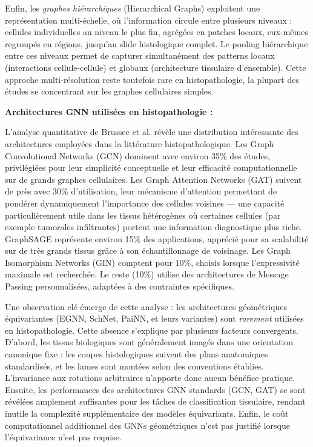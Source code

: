 Enfin, les \textit{graphes hiérarchiques} (Hierarchical Graphs) exploitent une représentation multi-échelle, où l'information circule entre plusieurs niveaux : cellules individuelles au niveau le plus fin, agrégées en patches locaux, eux-mêmes regroupés en régions, jusqu'au slide histologique complet. Le pooling hiérarchique entre ces niveaux permet de capturer simultanément des patterns locaux (interactions cellule-cellule) et globaux (architecture tissulaire d'ensemble). Cette approche multi-résolution reste toutefois rare en histopathologie, la plupart des études se concentrant sur les graphes cellulaires simples.

\textbf{Architectures GNN utilisées en histopathologie :}

L'analyse quantitative de Brussee et al. révèle une distribution intéressante des architectures employées dans la littérature histopathologique. Les Graph Convolutional Networks (GCN) dominent avec environ 35\% des études, privilégiées pour leur simplicité conceptuelle et leur efficacité computationnelle sur de grands graphes cellulaires. Les Graph Attention Networks (GAT) suivent de près avec 30\% d'utilisation, leur mécanisme d'attention permettant de pondérer dynamiquement l'importance des cellules voisines — une capacité particulièrement utile dans les tissus hétérogènes où certaines cellules (par exemple tumorales infiltrantes) portent une information diagnostique plus riche. GraphSAGE représente environ 15\% des applications, apprécié pour sa scalabilité sur de très grands tissus grâce à son échantillonnage de voisinage. Les Graph Isomorphism Networks (GIN) comptent pour 10\%, choisis lorsque l'expressivité maximale est recherchée. Le reste (10\%) utilise des architectures de Message Passing personnalisées, adaptées à des contraintes spécifiques.

Une observation clé émerge de cette analyse : les architectures géométriques équivariantes (EGNN, SchNet, PaiNN, et leurs variantes) sont \textit{rarement} utilisées en histopathologie. Cette absence s'explique par plusieurs facteurs convergents. D'abord, les tissus biologiques sont généralement imagés dans une orientation canonique fixe : les coupes histologiques suivent des plans anatomiques standardisés, et les lames sont montées selon des conventions établies. L'invariance aux rotations arbitraires n'apporte donc aucun bénéfice pratique. Ensuite, les performances des architectures GNN standards (GCN, GAT) se sont révélées amplement suffisantes pour les tâches de classification tissulaire, rendant inutile la complexité supplémentaire des modèles équivariants. Enfin, le coût computationnel additionnel des GNNs géométriques n'est pas justifié lorsque l'équivariance n'est pas requise.

